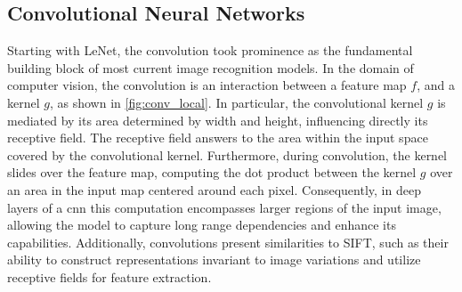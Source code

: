 \subsection{Convolutional Neural Networks}
\label{rel:sub_cnn}
Starting with LeNet, the convolution took prominence as the fundamental building block 
of most current image recognition models. In the domain of computer vision, the convolution is an 
interaction between a feature map $f$, and a kernel $g$, as shown in  
\autoref{fig:conv_local}. In particular, the convolutional kernel $g$ is mediated by its area 
determined by width and height, influencing directly its receptive field. The 
receptive field answers to the area within the input space covered by the convolutional kernel. 
Furthermore, during convolution, the kernel slides over the feature map, computing the dot product 
between the kernel $g$ over an area in the input map centered around each pixel. Consequently, in 
deep layers of a \gls{cnn} this computation encompasses larger regions of the input image, 
allowing the model to capture long range dependencies and enhance its capabilities. Additionally, 
convolutions present similarities to SIFT, such as their ability to construct representations 
invariant to image variations and utilize receptive fields for feature extraction.

